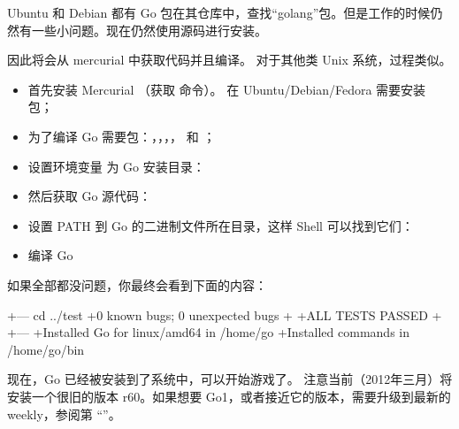Ubuntu 和 Debian 都有 Go 包在其仓库中，查找``golang''包。但是工作的时候仍然有一些小问题。现在仍然使用源码进行安装。

因此将会从 mercurial 中获取代码并且编译。
对于其他类 Unix 系统，过程类似。
\begin{itemize}
\item 首先安装 Mercurial （获取  命令）。
在 Ubuntu/Debian/Fedora 需要安装  包；

\item 为了编译 Go 需要包：，，，， 和 ；

\item 设置环境变量  为 Go 安装目录：
\begin{display}
\pr {}
\end{display}

\item 然后获取 Go 源代码：
\begin{display}
\pr {}
\end{display}

\item 设置 PATH 到 Go 的二进制文件所在目录，这样 Shell 可以找到它们：
\begin{display}
\pr {}
\end{display}

\item 编译 Go
\begin{display}
\pr {}
\pr {}
\end{display}
\end{itemize}
如果全部都没问题，你最终会看到下面的内容：
\begin{display}
+--- cd ../test
+0 known bugs; 0 unexpected bugs
+
+ALL TESTS PASSED
+
+---
+Installed Go for linux/amd64 in /home/go
+Installed commands in /home/go/bin
\end{display}
现在，Go 已经被安装到了系统中，可以开始游戏了。
注意当前（2012年三月）将安装一个很旧的版本 r60。如果想要 Go1，或者接近它的版本，需要升级到最新的 weekly，参阅第 ``''。

